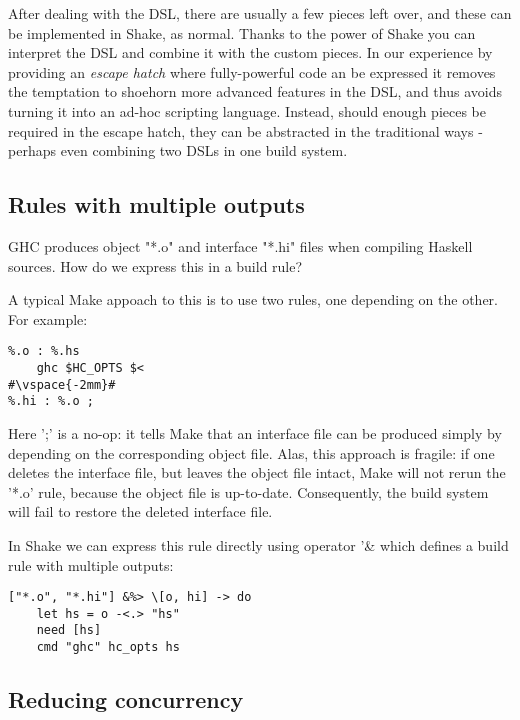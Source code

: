 After dealing with the DSL, there are usually a few pieces left over, and these
can be implemented in Shake, as normal. Thanks to the power of Shake you can
interpret the DSL and combine it with the custom pieces. In our experience by
providing an \emph{escape hatch} where fully-powerful code an be expressed it
removes the temptation to shoehorn more advanced features in the DSL, and thus
avoids turning it into an ad-hoc scripting language. Instead, should enough
pieces be required in the escape hatch, they can be abstracted in the
traditional ways - perhaps even combining two DSLs in one build system.

\subsection{Rules with multiple outputs\label{sec:multiple-outputs}}

GHC produces object \lst"*.o" and interface \lst"*.hi" files when compiling
Haskell sources. How do we express this in a build rule?

A typical Make appoach to this is to use two rules, one depending on the other.
For example:

\begin{lstlisting}
%.o : %.hs
    ghc $HC_OPTS $<
#\vspace{-2mm}#
%.hi : %.o ;
\end{lstlisting}
\noindent Here \lst';' is a no-op: it tells Make that an interface file can be
produced simply by depending on the corresponding object file. Alas, this
approach is fragile: if one deletes the interface file, but leaves the object
file intact, Make will not rerun the \lst'*.o' rule, because the object file is
up-to-date. Consequently, the build system will fail to restore the deleted
interface file.

In Shake we can express this rule directly using operator \lst'&%
which defines a build rule with multiple outputs:


\begin{lstlisting}
["*.o", "*.hi"] &%> \[o, hi] -> do
    let hs = o -<.> "hs"
    need [hs]
    cmd "ghc" hc_opts hs
\end{lstlisting}

\subsection{Reducing concurrency\label{sec:ghc-pkg-db}}

